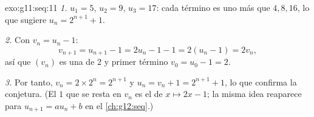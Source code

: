 \begin{solution}{exo:g11:seq:11}
\emph{1.} $u_1 = 5$, $u_2 = 9$, $u_3 = 17$: cada término es uno más que
$4, 8, 16$, lo que sugiere $u_n = 2^{n+1} + 1$.

\emph{2.} Con $v_n = u_n - 1$:
\[
v_{n+1} = u_{n+1} - 1 = 2u_n - 1 - 1 = 2(u_n - 1) = 2v_n,
\]
así que $(v_n)$ es una  de  $2$ y primer término
$v_0 = u_0 - 1 = 2$.

\emph{3.} Por tanto, $v_n = 2 \times 2^n = 2^{n+1}$ y
$u_n = v_n + 1 = 2^{n+1} + 1$, lo que confirma la conjetura. (El $1$ que
se resta en $v_n$ es el  de $x \mapsto 2x - 1$; la misma idea
reaparece para $u_{n+1} = au_n + b$ en el \cref{ch:g12:seq}.)
\end{solution}

